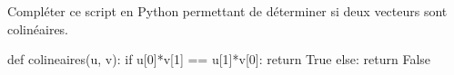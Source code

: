 \documentclass[a4paper]{article}
\begin{document}
    \begin{exercice}{}{}
    Compléter ce script en Python permettant de déterminer si deux vecteurs sont colinéaires.

\begin{CodePythontexAlt}[Largeur=0.75\linewidth, Centre, Lignes=false]{}
  def colineaires(u, v):
  if u[0]*v[1] == u[1]*v[0]:
    return True
  else:
    return False
  \end{CodePythontexAlt}

    \end{exercice}
\end{document}
